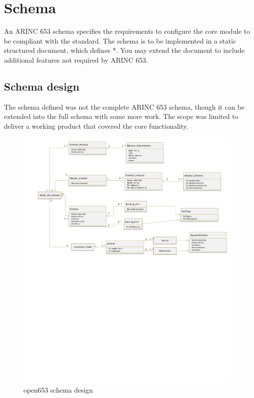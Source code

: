 \section{Schema}
\label{sec:design_schema}
An ARINC 653 schema specifies the requirements to configure the core module to be compliant with the standard. The schema is to be implemented in a static structured document, which defines *. You may extend the document to include additional features not required by ARINC 653.

\subsection{Schema design}

The schema defined was not the complete ARINC 653 schema, though it can be extended into the full schema with some more work. The scope was limited to deliver a working product that covered the core functionality.

\begin{figure}[H]
	\includegraphics[clip=true,trim=0cm 20cm 0cm 0cm,width=\linewidth,keepaspectratio]{figures/open653schema.pdf}
	\caption{open653 schema design}
	\label{fig:open653schema}
\end{figure}

